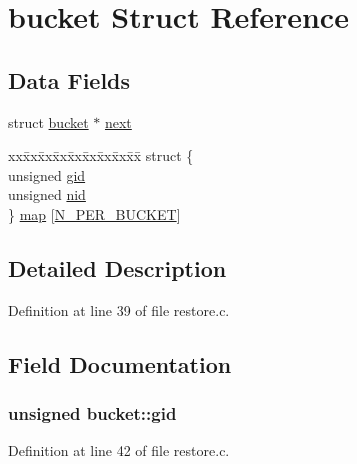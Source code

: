 \hypertarget{structbucket}{\section{bucket Struct Reference}
\label{structbucket}
}
\subsection*{Data Fields}
\begin{DoxyCompactItemize}
\item 
struct \hyperlink{structbucket}{bucket} $\ast$ \hyperlink{structbucket_a70c4dfb30de550c0caf1ce95f5e8803f}{next}
\item 
\begin{tabbing}
xx\=xx\=xx\=xx\=xx\=xx\=xx\=xx\=xx\=\kill
struct \{\\
\>unsigned \hyperlink{structbucket_ae577a155960997338a56f7b5d6a8fcac}{gid}\\
\>unsigned \hyperlink{structbucket_a4e1895c200b88f0355e2164c58ac49cb}{nid}\\
\} \hyperlink{structbucket_a7cd78d1e66df897b15f34f0fd2169b5e}{map} \mbox{[}\hyperlink{restore_8c_ae53e4619edbbd064609e14604e5f1b53}{N\_PER\_BUCKET}\mbox{]}\\

\end{tabbing}\end{DoxyCompactItemize}


\subsection{Detailed Description}


Definition at line 39 of file restore.\+c.



\subsection{Field Documentation}
\hypertarget{structbucket_ae577a155960997338a56f7b5d6a8fcac}{
\subsubsection[{gid}]{\setlength{\rightskip}{0pt plus 5cm}unsigned bucket\+::gid}}\label{structbucket_ae577a155960997338a56f7b5d6a8fcac}


Definition at line 42 of file restore.\+c.




